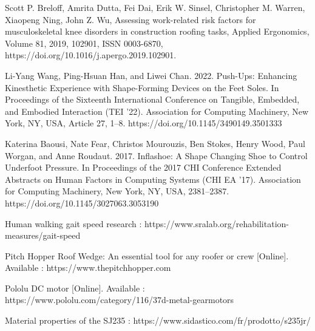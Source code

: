 \documentclass[lettersize,journal]{IEEEtran}
\begin{document}
 


\cleardoublepage

\begin{thebibliography}{1}


Scott P. Breloff, Amrita Dutta, Fei Dai, Erik W. Sinsel, Christopher M. Warren, Xiaopeng Ning, John Z. Wu, Assessing work-related risk factors for musculoskeletal knee disorders in construction roofing tasks, Applied Ergonomics, Volume 81, 2019, 102901, ISSN 0003-6870, https://doi.org/10.1016/j.apergo.2019.102901.

Li-Yang Wang, Ping-Hsuan Han, and Liwei Chan. 2022. Push-Ups: Enhancing Kinesthetic Experience with Shape-Forming Devices on the Feet Soles. In Proceedings of the Sixteenth International Conference on Tangible, Embedded, and Embodied Interaction (TEI '22). Association for Computing Machinery, New York, NY, USA, Article 27, 1–8. https://doi.org/10.1145/3490149.3501333

Katerina Baousi, Nate Fear, Christos Mourouzis, Ben Stokes, Henry Wood, Paul Worgan, and Anne Roudaut. 2017. Inflashoe: A Shape Changing Shoe to Control Underfoot Pressure. In Proceedings of the 2017 CHI Conference Extended Abstracts on Human Factors in Computing Systems (CHI EA '17). Association for Computing Machinery, New York, NY, USA, 2381–2387. https://doi.org/10.1145/3027063.3053190

Human walking gait speed research : 
https://www.sralab.org/rehabilitation-measures/gait-speed

Pitch Hopper Roof Wedge: An essential tool for any roofer or crew [Online]. Available : https://www.thepitchhopper.com


 Pololu DC motor [Online]. Available : https://www.pololu.com/category/116/37d-metal-gearmotors

 Material properties of the SJ235 : https://www.sidastico.com/fr/prodotto/s235jr/








\end{thebibliography}
\end{document}
